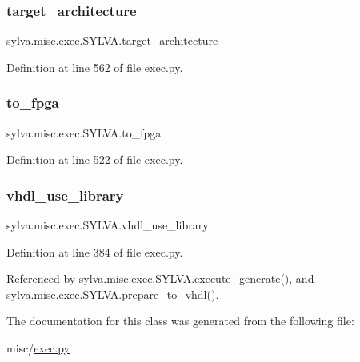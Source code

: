 \subsubsection{\texorpdfstring{target\+\_\+architecture}{target\_architecture}}
{\footnotesize\ttfamily sylva.\+misc.\+exec.\+S\+Y\+L\+V\+A.\+target\+\_\+architecture}



Definition at line 562 of file exec.\+py.

\mbox{\label{classsylva_1_1misc_1_1exec_1_1_s_y_l_v_a_af22003ff472d2eefe8f94bdea7c1284b}} 
\subsubsection{\texorpdfstring{to\+\_\+fpga}{to\_fpga}}
{\footnotesize\ttfamily sylva.\+misc.\+exec.\+S\+Y\+L\+V\+A.\+to\+\_\+fpga}



Definition at line 522 of file exec.\+py.

\mbox{\label{classsylva_1_1misc_1_1exec_1_1_s_y_l_v_a_af39a0e981697bb8ef909adea5bdaa07d}} 
\subsubsection{\texorpdfstring{vhdl\+\_\+use\+\_\+library}{vhdl\_use\_library}}
{\footnotesize\ttfamily sylva.\+misc.\+exec.\+S\+Y\+L\+V\+A.\+vhdl\+\_\+use\+\_\+library}



Definition at line 384 of file exec.\+py.



Referenced by sylva.\+misc.\+exec.\+S\+Y\+L\+V\+A.\+execute\+\_\+generate(), and sylva.\+misc.\+exec.\+S\+Y\+L\+V\+A.\+prepare\+\_\+to\+\_\+vhdl().



The documentation for this class was generated from the following file\+:\begin{DoxyCompactItemize}
\item 
misc/\hyperlink{exec_8py}{exec.\+py}\end{DoxyCompactItemize}
